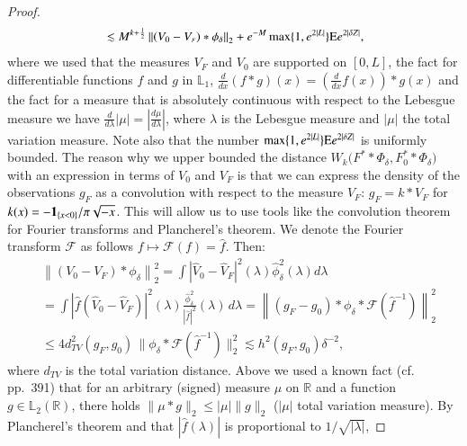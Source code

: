 \begin{proof}
\begin{align*}
        &\quad \lesssim M^{k+\frac{1}{2} }\left\| \left(V_0  - V_{\scriptscriptstyle{F}} \right)  * \phi_\delta  \right\|_2+e^{-M} \max\{1,e^{2|L|}\} \mathrm{E} e^{2|\delta Z|},
    \end{align*}
    where we used that the measures $V_{\scriptscriptstyle{F}}$ and $V_0$ are supported on $[0,L]$, the fact for differentiable functions $f$ and $g$ in $\mathbb{L}_1$, $\frac{d}{dx} (f*g)(x) =  (\frac{d}{dx}f(x))*g(x)$ and the fact for a measure that is absolutely continuous with respect to the Lebesgue measure we have $\frac{d}{d\lambda}|\mu| = |\frac{d\mu}{d\lambda}|$, where $\lambda$ is the Lebesgue measure and $|\mu|$ the total variation measure. Note also that the number $\max\{1,e^{2|L|}\} \mathrm{E} e^{2|\delta Z|}$ is uniformly bounded. The reason why we upper bounded the distance $ W_k\big(F^* * \Phi_\delta, F^*_0 * \Phi_\delta\big)$ with an expression in terms of $V_0 $ and $ V_{\scriptscriptstyle{F}}$ is that we can express the density of the observations $g_{\scriptscriptstyle{F}}$ as a convolution with respect to the measure $ V_{\scriptscriptstyle{F}}$: $g_{\scriptscriptstyle{F}} = k * V_{\scriptscriptstyle{F}} $ for $k(x) = -\mathbf{1}_{\{x < 0 \}}/ \pi \sqrt{-x}$. This will allow us to use tools like the convolution theorem for Fourier transforms and Plancherel's theorem. We denote the Fourier transform $\mathcal{F}$ as follows $f \mapsto \mathcal{F}(f) = \hat{f}$. Then:
    $$
    \begin{aligned}
        &\left\|\left(V_0  - V_{\scriptscriptstyle{F}}  \right)  * \phi_\delta \right\|_2^2 = \int\left|\hat{V}_0-\hat{V}_{\scriptscriptstyle{F}}\right|^2(\lambda) \hat{\phi}_\delta^2(\lambda) d \lambda\\
        &=\int\left|\hat{f}(\hat{V}_0-\hat{V}_{\scriptscriptstyle{F}})\right|^2 (\lambda) \frac{\hat{\phi}_\delta^2}{|\hat{f}|^2}(\lambda) \, d \lambda = \left\|(g_{\scriptscriptstyle{F}}-g_0) * \phi_{\delta} * \mathcal{F}(\hat{f}^{-1}) \right\|_2^2 \\
        & \leq 4 d_{\scriptscriptstyle{TV}}^2 (g_{\scriptscriptstyle{F}},g_0) \,  \|\phi_{\delta} * \mathcal{F}(\hat{f}^{-1}) \|_2^2  \lesssim h^2\left(g_{\scriptscriptstyle{F}}, g_0\right)\delta^{-2},
    \end{aligned}
    $$
    where $d_{\scriptscriptstyle{TV}}$ is the total variation distance. Above we used a known fact (cf.\ \cite{32} pp.\ 391) that for an arbitrary (signed) measure $\mu$ on $\mathbb{R}$ and a function $g \in \mathbb{L}_2 (\mathbb{R})$, there holds $\| \mu * g \|_2 \leq |\mu| \| g\|_2$ ($|\mu|$ total variation measure). By Plancherel's theorem and that $|\hat{f}(\lambda)|$ is proportional to $1/ \sqrt{|\lambda|}$, 

\end{proof}
